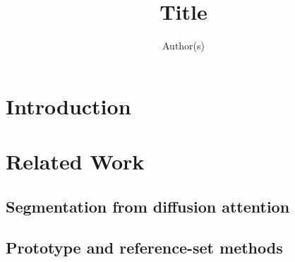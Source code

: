 \documentclass[runningheads]{llncs}
\newcommand{\figbox}[2]{\fbox{\parbox[c][#2][c]{0.95\linewidth}{\centering\small\textcolor{gray}{#1}}}}
\begin{document}
\title{Title}
\author{Author(s)}

\maketitle

\begin{abstract}
\end{abstract}


\section{Introduction}
\label{sec:intro}

\begin{figure}[t]
\centering
\figbox{Teaser: photo, class word, cross-attention seed, gate, final mask; one seen and one unseen class.}{3.2cm}
\caption{}
\label{fig:teaser}
\end{figure}

\section{Related Work}
\label{sec:related}

\subsection{Segmentation from diffusion attention}

\subsection{Prototype and reference-set methods}
\end{document}
